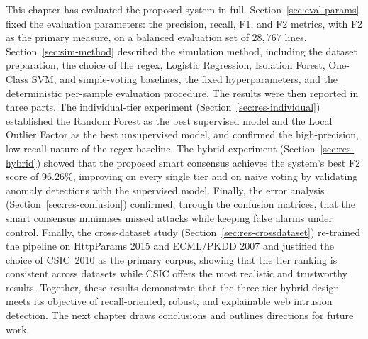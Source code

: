 \documentclass[12pt,a4paper]{report}
\begin{document}
This chapter has evaluated the proposed system in full.
Section~\ref{sec:eval-params} fixed the evaluation parameters: the
precision, recall, F1, and F2 metrics, with F2 as the primary measure, on a
balanced evaluation set of $28{,}767$ lines.
Section~\ref{sec:sim-method} described the simulation method, including the
dataset preparation, the choice of the regex, Logistic Regression, Isolation
Forest, One-Class SVM, and simple-voting baselines, the fixed
hyperparameters, and the deterministic per-sample evaluation procedure. The
results were then reported in three parts. The individual-tier experiment
(Section~\ref{sec:res-individual}) established the Random Forest as the best
supervised model and the Local Outlier Factor as the best unsupervised model,
and confirmed the high-precision, low-recall nature of the regex baseline.
The hybrid experiment (Section~\ref{sec:res-hybrid}) showed that the proposed
smart consensus achieves the system's best F2 score of $96.26\%$, improving on
every single tier and on naive voting by validating anomaly detections with
the supervised model. Finally, the error analysis
(Section~\ref{sec:res-confusion}) confirmed, through the confusion matrices,
that the smart consensus minimises missed attacks while keeping false alarms
under control. Finally, the cross-dataset study
(Section~\ref{sec:res-crossdataset}) re-trained the pipeline on HttpParams
2015 and ECML/PKDD 2007 and justified the choice of CSIC~2010 as the primary
corpus, showing that the tier ranking is consistent across datasets while
CSIC offers the most realistic and trustworthy results. Together, these
results demonstrate that the three-tier hybrid design meets its objective of
recall-oriented, robust, and explainable web intrusion detection. The next
chapter draws conclusions and outlines directions for future work.

\end{document}
